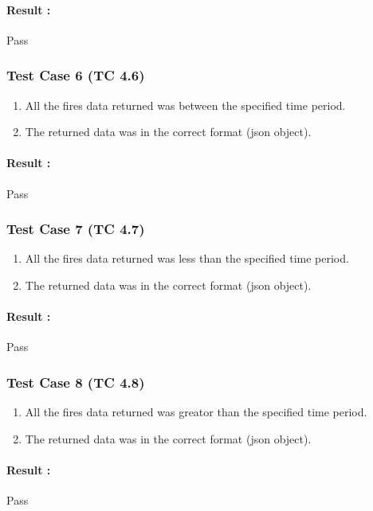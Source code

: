 \paragraph{Result :} Pass

\subsubsection{Test Case 6 (TC 4.6)}

\begin{enumerate}
	\item All the fires data returned was between the specified time period.
	\item The returned data was in the correct format (json object).
\end{enumerate}

\paragraph{Result :} Pass

\subsubsection{Test Case 7 (TC 4.7)}

\begin{enumerate}
	\item All the fires data returned was less than the specified time period.
	\item The returned data was in the correct format (json object).
\end{enumerate}

\paragraph{Result :} Pass

\subsubsection{Test Case 8 (TC 4.8)}

\begin{enumerate}
	\item All the fires data returned was greator than the specified time period.
	\item The returned data was in the correct format (json object).
\end{enumerate}

\paragraph{Result :} Pass

